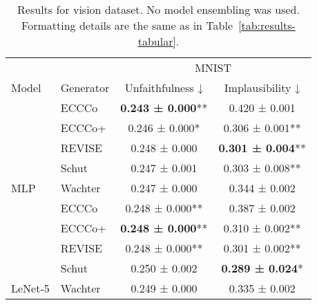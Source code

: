 \begin{table}

\caption{Results for vision dataset. No model ensembling was used. Formatting details are the same as in Table~\ref{tab:results-tabular}. \label{tab:results-vision} \newline}
\centering
\fontsize{9}{11}\selectfont
\begin{tabular}[t]{llcc}
\toprule
\multicolumn{2}{c}{ } & \multicolumn{2}{c}{MNIST} \\
\cmidrule(l{3pt}r{3pt}){3-4}
Model & Generator & Unfaithfulness ↓ & Implausibility ↓\\
\midrule
 & ECCCo & \textbf{0.243 ± 0.000}** & 0.420 ± 0.001\hphantom{*}\hphantom{*}\\

 & ECCCo+ & 0.246 ± 0.000*\hphantom{*} & 0.306 ± 0.001**\\

 & REVISE & 0.248 ± 0.000\hphantom{*}\hphantom{*} & \textbf{0.301 ± 0.004}**\\

 & Schut & 0.247 ± 0.001\hphantom{*}\hphantom{*} & 0.303 ± 0.008**\\

\multirow{-5}{*}{\raggedright\arraybackslash MLP} & Wachter & 0.247 ± 0.000\hphantom{*}\hphantom{*} & 0.344 ± 0.002\hphantom{*}\hphantom{*}\\
\cmidrule{1-4}
 & ECCCo & 0.248 ± 0.000** & 0.387 ± 0.002\hphantom{*}\hphantom{*}\\

 & ECCCo+ & \textbf{0.248 ± 0.000}** & 0.310 ± 0.002**\\

 & REVISE & 0.248 ± 0.000** & 0.301 ± 0.002**\\

 & Schut & 0.250 ± 0.002\hphantom{*}\hphantom{*} & \textbf{0.289 ± 0.024}*\hphantom{*}\\

\multirow{-5}{*}{\raggedright\arraybackslash LeNet-5} & Wachter & 0.249 ± 0.000\hphantom{*}\hphantom{*} & 0.335 ± 0.002\hphantom{*}\hphantom{*}\\
\bottomrule
\end{tabular}
\end{table}
